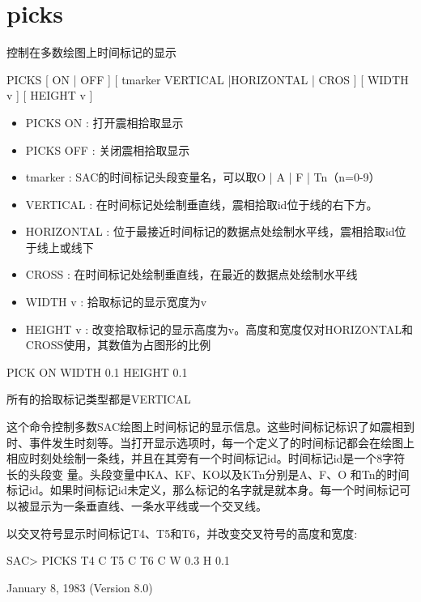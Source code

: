 \section{picks}
\label{cmd:picks}

控制在多数绘图上时间标记的显示

PICKS [ ON | OFF ] [ tmarker VERTICAL |HORIZONTAL | CROS ] [ WIDTH v ] [ HEIGHT v ]

\begin{itemize}
\item PICKS ON : 打开震相拾取显示 
\item PICKS OFF : 关闭震相拾取显示 
\item tmarker : SAC的时间标记头段变量名，可以取O | A | F | Tn（n=0-9）
\item VERTICAL : 在时间标记处绘制垂直线，震相拾取id位于线的右下方。
\item HORIZONTAL : 位于最接近时间标记的数据点处绘制水平线，震相拾取id位于线上或线下
\item CROSS : 在时间标记处绘制垂直线，在最近的数据点处绘制水平线 
\item WIDTH v : 拾取标记的显示宽度为v 
\item HEIGHT v : 改变拾取标记的显示高度为v。高度和宽度仅对HORIZONTAL和CROSS使用，其数值为占图形的比例 
\end{itemize}

PICK ON WIDTH 0.1 HEIGHT 0.1

所有的拾取标记类型都是VERTICAL

这个命令控制多数SAC绘图上时间标记的显示信息。这些时间标记标识了如震相到时、事件发生时刻等。当打开显示选项时，每一个定义了的时间标记都会在绘图上相应时刻处绘制一条线，并且在其旁有一个时间标记id。时间标记id是一个8字符长的头段变	量。头段变量中KA、KF、KO以及KTn分别是A、F、O 和Tn的时间标记id。如果时间标记id未定义，那么标记的名字就是就本身。每一个时间标记可以被显示为一条垂直线、一条水平线或一个交叉线。

以交叉符号显示时间标记T4、T5和T6，并改变交叉符号的高度和宽度:
\begin{SACCode}
SAC> PICKS T4 C T5 C T6 C W 0.3 H 0.1
\end{SACCode}

January 8, 1983 (Version 8.0)

